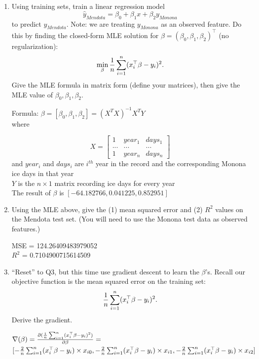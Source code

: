 \documentclass[a4paper]{article}
\theoremstyle{definition}
\newenvironment{soln}{
    \leavevmode\color{blue}\ignorespaces
}{}
\begin{document}
\begin{enumerate}
\item
Using training sets, train a linear regression model
$$\hat y_{Mendota} = \beta_0 + \beta_1 x + \beta_2 y_{Monona}$$
to predict $y_{Mendota}$.
Note: we are treating $y_{Monona}$ as an observed feature.
Do this by finding the closed-form MLE solution for $\beta=(\beta_0, \beta_1, \beta_2)^\top$ (no regularization):
$$\min_\beta {1\over n} \sum_{i=1}^n (x_i^\top \beta - y_i)^2.$$
Give the MLE formula in matrix form (define your matrices), then give the MLE value of $\beta_0, \beta_1, \beta_2$. 

\begin{soln}
Formula: $\beta = [\beta_0, \beta_1, \beta_2] = (X^TX)^{-1}X^TY$\\
where 

$$  
X =
\begin{bmatrix}
   1 & year_1 & days_1 \\
   ...& ... & ... \\
   1 & year_{n} & days_{n} 
 \end{bmatrix} $$ 
and $year_i$ and $days_i$ are $i^{th}$ year in the record and the corresponding Monona ice days in that year\\
$Y$ is the $n\times 1$ matrix recording ice days for every year\\
The result of $\beta$ is $[-64.182766, 0.041225, 0.852951]$

\end{soln} 


\item
Using the MLE above, give the (1) mean squared error and (2) $R^2$ values on the Mendota test set.
(You will need to use the Monona test data as observed features.)


\begin{soln}
MSE = 124.26409483979052\\ 
$R^{2}$ = 0.7104900715614509
\end{soln}

\item
``Reset'' to Q3, but this time use gradient descent to learn the $\beta$'s.
Recall our objective function is the mean squared error on the training set:
$${1\over n} \sum_{i=1}^n (x_i^\top \beta - y_i)^2.$$
Derive the gradient.

\begin{soln}
$\nabla(\beta) = \frac{\partial ({1\over n} \sum_{i=1}^n (x_i^\top \beta - y_i)^2)}{\partial \beta} =$\\ $ [-{2\over n} \sum_{i=1}^n (x_i^\top \beta - y_i)\times x_{i0}, -{2\over n} \sum_{i=1}^n (x_i^\top \beta - y_i)\times x_{i1}, -{2\over n} \sum_{i=1}^n (x_i^\top \beta - y_i)\times x_{i2}]$\\


\end{soln}
\end{enumerate}
\end{document}
